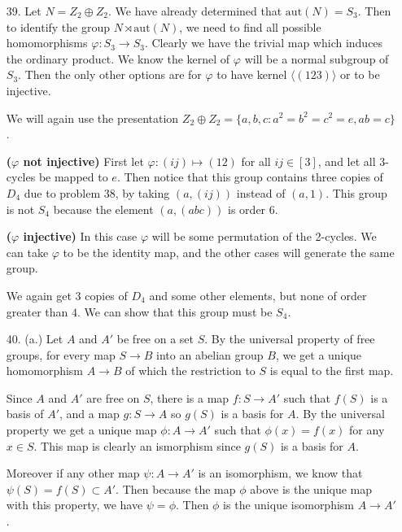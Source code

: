 \documentclass[12pt, reqno]{article}
\theoremstyle{plain}
\theoremstyle{definition}
\theoremstyle{remark}
\begin{document}
\begin{enumerate}
    \item[39.] Let $N = Z_2 \oplus Z_2$. We have already determined that $\text{aut}(N) = S_3$. Then
    to identify the group $N\rtimes \text{aut}(N)$, we need to find all possible homomorphisms 
    $\varphi: S_3 \rightarrow S_3$. Clearly we have the trivial map which induces the ordinary product. 
    We know the kernel of $\varphi$ will be a normal subgroup of $S_3$. Then the only other options are for 
    $\varphi$ to have kernel $\langle (123)\rangle$ or to be injective.

    We will again use the presentation $Z_2 \oplus Z_2 = \{a, b, c: a^2 = b^2 = c^2 = e, ab = c\}$.

    \textbf{($\varphi$ not injective)}
    First let $\varphi: (ij) \mapsto (12)$ for all $ij \in [3]$, and let all 3-cycles be mapped to $e$. Then
    notice that this group contains three copies of $D_4$ due to problem 38, by taking $(a, (ij))$ instead
    of $(a, 1)$. This group is not $S_4$ because the element $(a, (abc))$ is order $6$. 

    \textbf{($\varphi$ injective)}
    In this case $\varphi$ will be some permutation of the 2-cycles. We can take $\varphi$ to be the identity
    map, and the other cases will generate the same group. 

    We again get $3$ copies of $D_4$ and some other elements, but none of order greater than $4$. We can 
    show that this group must be $S_4$. 

    \item[40.] (a.) Let $A$ and $A'$ be free on a set $S$. By the universal property of free groups, for every
    map $S \rightarrow B$ into an abelian group $B$, we get a unique homomorphism $A \rightarrow B$ of which
    the restriction to $S$ is equal to the first map. 
    
    Since $A$ and $A'$ are free on $S$, there is a map $f: S \rightarrow A'$ such that $f(S)$ is a basis
    of $A'$, and a map $g: S \rightarrow A$ so $g(S)$ is a basis for $A$.
    By the universal property we get a unique map $\phi: A \rightarrow A'$ such that 
    $\phi(x) = f(x)$ for any $x \in S$. This map is clearly an ismorphism since $g(S)$ is a basis for $A$. 

    Moreover if any other map $\psi: A \rightarrow A'$ is an isomorphism, we know that $\psi(S) = f(S) \subset A'$. 
    Then because the map $\phi$ above is the unique map with this property, we have $\psi = \phi$. Then $\phi$ is 
    the unique isomorphism $A \rightarrow A'$. 


\end{enumerate}
\end{document}
